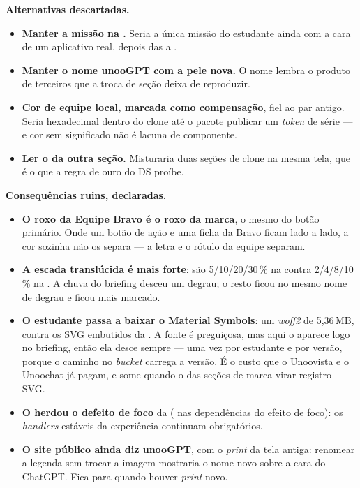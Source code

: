 \textbf{Alternativas descartadas.}

\begin{itemize}
  \item \textbf{Manter a missão na .} Seria a única missão do
    estudante ainda com a cara de um aplicativo real, depois das
     a .
  \item \textbf{Manter o nome unooGPT com a pele nova.} O nome lembra o
    produto de terceiros que a troca de seção deixa de reproduzir.
  \item \textbf{Cor de equipe local, marcada como compensação}, fiel ao par
    antigo. Seria hexadecimal dentro do clone até o pacote publicar um
    \emph{token} de série --- e cor sem significado não é lacuna de componente.
  \item \textbf{Ler o  da outra seção.} Misturaria duas
    seções de clone na mesma tela, que é o que a regra de ouro do DS proíbe.
\end{itemize}

\textbf{Consequências ruins, declaradas.}

\begin{itemize}
  \item \textbf{O roxo da Equipe Bravo é o roxo da marca}, o mesmo do botão
    primário. Onde um botão de ação e uma ficha da Bravo ficam lado a lado, a
    cor sozinha não os separa --- a letra e o rótulo da equipe separam.
  \item \textbf{A escada translúcida é mais forte}:  são
    5/10/20/30\,\% na  contra 2/4/8/10\,\% na . A
    chuva do briefing desceu um degrau; o resto ficou no mesmo nome de degrau e
    ficou mais marcado.
  \item \textbf{O estudante passa a baixar o Material Symbols}: um
    \emph{woff2} de 5,36\,MB, contra os SVG embutidos da . A fonte
    é preguiçosa, mas aqui o  aparece logo no briefing, então ela
    desce sempre --- uma vez por estudante e por versão, porque o caminho no
    \emph{bucket} carrega a versão. É o custo que o Unoovista e o Unoochat já
    pagam, e some quando o  das seções de marca virar registro SVG.
  \item \textbf{O  herdou o defeito de foco} da 
    ( nas dependências do efeito de foco): os \emph{handlers}
    estáveis da experiência continuam obrigatórios.
  \item \textbf{O site público ainda diz unooGPT}, com o \emph{print} da tela
    antiga: renomear a legenda sem trocar a imagem mostraria o nome novo sobre
    a cara do ChatGPT. Fica para quando houver \emph{print} novo.
\end{itemize}

